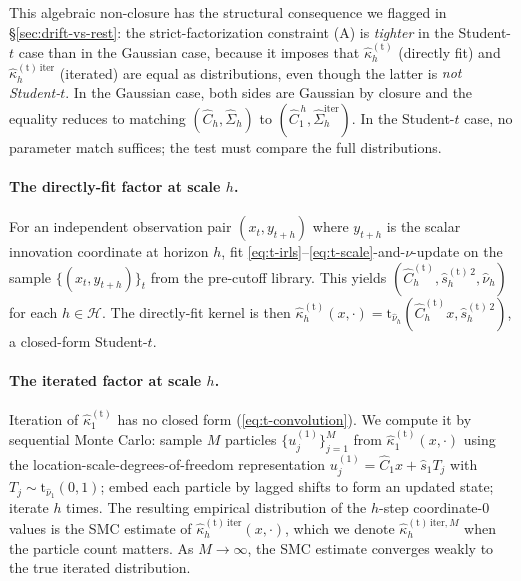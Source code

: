 \documentclass[11pt]{article}
\newcommand{\Studt}{\mathrm{t}}
\newcommand{\Hcal}{\mathcal{H}}
\theoremstyle{definition}
\theoremstyle{plain}
\begin{document}
This algebraic non-closure has the structural consequence we
flagged in \S\ref{sec:drift-vs-rest}: the strict-factorization
constraint (A) is \emph{tighter} in the Student-$t$ case than in
the Gaussian case, because it imposes that $\hat\kappa_{h}^{(\Studt)}$
(directly fit) and $\hat\kappa_h^{(\Studt)\, \mathrm{iter}}$
(iterated) are equal as distributions, even though the latter is
\emph{not Student-$t$}. In the Gaussian case, both sides are
Gaussian by closure and the equality reduces to matching
$(\hat C_h, \hat\Sigma_h)$ to $(\hat C_1^{\, h}, \hat\Sigma_h^{\mathrm{iter}})$.
In the Student-$t$ case, no parameter match suffices; the test must
compare the full distributions.

\paragraph{The directly-fit factor at scale $h$.}
For an independent observation pair $(x_t, y_{t+h})$ where
$y_{t+h}$ is the scalar innovation coordinate at horizon $h$, fit
\eqref{eq:t-irls}--\eqref{eq:t-scale}-and-$\nu$-update on the
sample $\{(x_t, y_{t+h})\}_t$ from the pre-cutoff library. This
yields $(\hat C_h^{(\Studt)}, \hat s_h^{(\Studt)\,2}, \hat\nu_h)$ for
each $h \in \Hcal$. The directly-fit kernel is then
$\hat\kappa_h^{(\Studt)}(x, \cdot) = \Studt_{\hat\nu_h}(\hat C_h^{(\Studt)} x,
\hat s_h^{(\Studt)\,2})$, a closed-form Student-$t$.

\paragraph{The iterated factor at scale $h$.}
Iteration of $\hat\kappa_1^{(\Studt)}$ has no closed form
(\ref{eq:t-convolution}). We compute it by sequential Monte Carlo:
sample $M$ particles $\{u_j^{(1)}\}_{j=1}^{M}$ from $\hat\kappa_1^{(\Studt)}(x, \cdot)$
using the location-scale-degrees-of-freedom representation
$u_j^{(1)} = \hat C_1 x + \hat s_1 T_j$ with $T_j \sim \Studt_{\hat\nu_1}(0, 1)$;
embed each particle by lagged shifts to form an updated state;
iterate $h$ times. The resulting empirical distribution of the
$h$-step coordinate-0 values is the SMC estimate of
$\hat\kappa_h^{(\Studt)\,\mathrm{iter}}(x, \cdot)$, which we
denote $\hat\kappa_h^{(\Studt)\,\mathrm{iter}, M}$ when the particle
count matters. As $M \to \infty$, the SMC estimate converges weakly
to the true iterated distribution.
\end{document}
